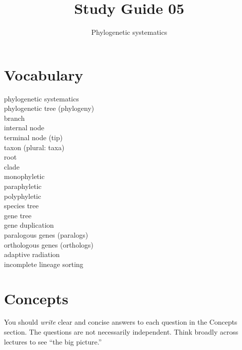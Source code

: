 \documentclass[letterpaper]{tufte-handout}
\title{Study Guide 05\hfill}
\author{Phylogenetic systematics}
\date{} %
\begin{document}
\maketitle	%


\section{Vocabulary}
\vspace{-1\baselineskip}
\begin{multicols}{2}
	phylogenetic systematics\\
	phylogenetic tree (phylogeny)\\
	branch \\
	internal node\\
	terminal node (tip) \\
	taxon (plural: taxa) \\
	root \\
	clade \\
	monophyletic \\
	paraphyletic \\
	polyphyletic \\
	species tree \\
	gene tree \\
	gene duplication \\
	paralogous genes (paralogs) \\
	orthologous genes (orthologs) \\
	adaptive radiation \\
	incomplete lineage sorting \\
\end{multicols}

\section{Concepts}

You should \emph{write} clear and concise answers to each question in the Concepts section.  The questions are not necessarily independent.  Think broadly across lectures to see ``the big picture.'' 
\end{document}
